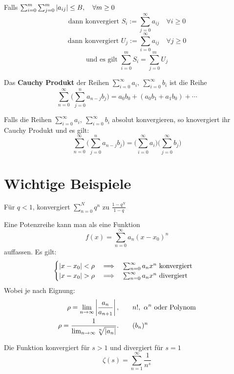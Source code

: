 \Satz[2.7.23] Falls $\sum_{i=0}^{m}\sum_{j=0}^{m}\left\lvert a_{ij} \right\rvert \leq B, \quad \forall m \geq 0$
\[ \text{dann konvergiert } S_{i} := \sum_{j=0}^{\infty} a_{ij} \quad \forall i \geq 0 \]
\[ \text{dann konvergiert } U_{j} := \sum_{i=0}^{\infty} a_{ij} \quad \forall j \geq 0 \]
\[ \text{und es gilt } \sum_{i=0}^{m} S_{i} = \sum_{j=0}^{m} U_{j} \]

\Satz[2.7.24] Das \textbf{Cauchy Produkt} der Reihen $\sum_{i=0}^{\infty} a_i, \ \sum_{i=0}^{\infty} b_i$ ist die Reihe
\[\sum_{n=0}^\infty \Bigg(\sum_{j=0}^{n} a_{n-j} b_{j} \Bigg) = a_0 b_0 + (a_0 b_1 + a_1 b_0) + \cdots  \]

\Satz[2.7.26] Falls die Reihen $\sum_{i=0}^{\infty} a_i, \ \sum_{i=0}^{\infty} b_i$ absolut konvergieren, so knovergiert ihr Cauchy Produkt und es gilt:
\[\sum_{n=0}^\infty \Bigg(\sum_{j=0}^{n} a_{n-j} b_{j} \Bigg) = \Bigg( \sum_{i=0}^\infty a_i \Bigg) \Bigg(\sum_{j=0}^\infty b_j \Bigg) \]



\section{Wichtige Beispiele}
 Für $q<1$, konvergiert $\sum_{n=0}^N q^n$ zu $\frac{1-q^N}{1-q}$

\Bsp[Potenzreihe] Eine Potenzreihe kann man als eine Funktion 
\[
f(x)=\sum_{n=0}^\infty a_n
(x-x_0)^n
\]
auffassen. Es gilt:
\[
\begin{cases}
\left\lvert x-x_0 \right\rvert< \rho \quad \Longrightarrow \quad \sum_{n=0}^\infty a_nx^n \text{
konvergiert}\\
\left\lvert x-x_0 \right\rvert> \rho \quad \Longrightarrow \quad \sum_{n=0}^\infty a_nx^n \text{
divergiert}\\
\end{cases}
\]
Wobei je nach Eignung: 
\begin{align*}
\rho = \lim_{n\to\infty} \abs{\frac{a_n}{a_{n+1}}}, &\qquad n!, \ \alpha^{n}
\text{ oder Polynom}\\
\rho = \frac{1}{\lim_{n\to\infty}\sqrt[n]{\abs{a_n}}}. &\qquad(b_n)^n
\end{align*}



 Die Funktion konvergiert für $s>1$ und divergiert für $s=1$
$$\zeta(s)=\sum_{n=1}^{\infty} \frac{1}{n^{s}}$$

